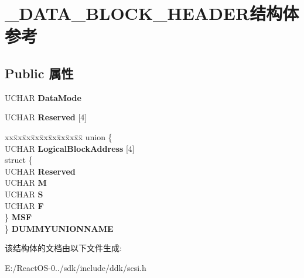 \hypertarget{struct___d_a_t_a___b_l_o_c_k___h_e_a_d_e_r}{}\section{\+\_\+\+D\+A\+T\+A\+\_\+\+B\+L\+O\+C\+K\+\_\+\+H\+E\+A\+D\+E\+R结构体 参考}
\label{struct___d_a_t_a___b_l_o_c_k___h_e_a_d_e_r}
\subsection*{Public 属性}
\begin{DoxyCompactItemize}
\item 
\mbox{\label{struct___d_a_t_a___b_l_o_c_k___h_e_a_d_e_r_a99ed8ba69d896498c5bd2963c164694f}} 
U\+C\+H\+AR {\bfseries Data\+Mode}
\item 
\mbox{\label{struct___d_a_t_a___b_l_o_c_k___h_e_a_d_e_r_a141a9e6212a15d79ab8a5eed89a36719}} 
U\+C\+H\+AR {\bfseries Reserved} \mbox{[}4\mbox{]}
\item 
\mbox{\label{struct___d_a_t_a___b_l_o_c_k___h_e_a_d_e_r_a8f78dad850f45a6d0dd5dba4dc71ee52}} 
\begin{tabbing}
xx\=xx\=xx\=xx\=xx\=xx\=xx\=xx\=xx\=\kill
union \{\\
\>UCHAR {\bfseries LogicalBlockAddress} \mbox{[}4\mbox{]}\\
\>struct \{\\
\>\>UCHAR {\bfseries Reserved}\\
\>\>UCHAR {\bfseries M}\\
\>\>UCHAR {\bfseries S}\\
\>\>UCHAR {\bfseries F}\\
\>\} {\bfseries MSF}\\
\} {\bfseries DUMMYUNIONNAME}\\

\end{tabbing}\end{DoxyCompactItemize}


该结构体的文档由以下文件生成\+:\begin{DoxyCompactItemize}
\item 
E\+:/\+React\+O\+S-\/0../sdk/include/ddk/scsi.\+h\end{DoxyCompactItemize}
